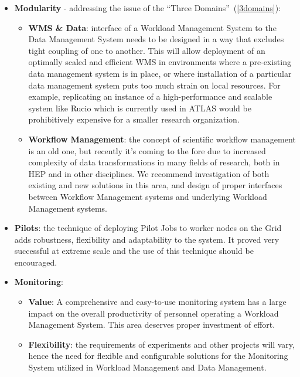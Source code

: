 \begin{itemize}

\item \textbf{Modularity} - addressing the issue of the ``Three Domains''~(\ref{3domains}):
\begin{itemize}
\item \textbf{WMS \& Data}: interface of a Workload Management System to the Data Management System needs to be designed in a way that
excludes tight coupling of one to another. This will allow deployment of an optimally scaled and efficient WMS in environments where a pre-existing
data management  system is in place, or where installation of a particular data management system puts too much strain on local resources. For example,
replicating an instance of a high-performance and scalable system like Rucio which is currently used in ATLAS would be prohibitively expensive for
a smaller research organization.

\item \textbf{Workflow Management}: the concept of scientific workflow management is an old one, but recently it's coming to the fore due to
increased complexity of data transformations in many fields of research, both in HEP and in other disciplines. We recommend investigation of both existing
and new solutions in this area, and design of proper interfaces between Workflow Management systems and underlying Workload Management systems.

\end{itemize}

\item \textbf{Pilots}: the technique of deploying Pilot Jobs to worker nodes on the Grid adds robustness, flexibility and adaptability to the system.
It proved very successful at extreme scale and the use of this technique should be encouraged.

\item \textbf{Monitoring}:
\begin{itemize}
\item \textbf{Value}: A comprehensive and easy-to-use monitoring system has a large impact on the overall productivity of personnel operating a Workload Management System.
This area deserves proper investment of effort.

\item \textbf{Flexibility}: the requirements of experiments and other projects will vary, hence the need for flexible and configurable solutions
for the Monitoring System utilized in Workload Management and Data Management.


\end{itemize}
\end{itemize}
